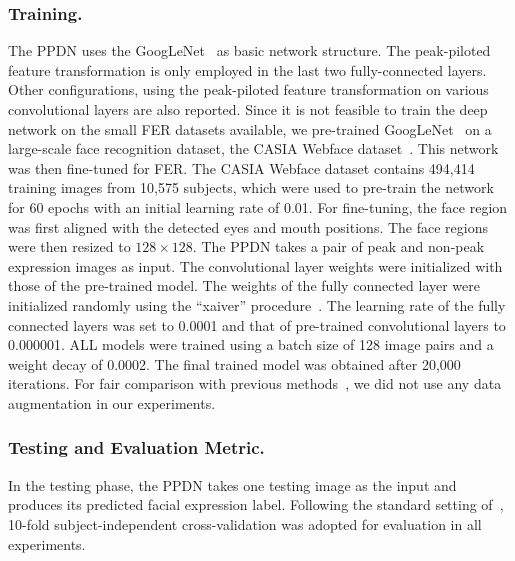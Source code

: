 \documentclass[runningheads]{llncs}
\begin{document}
\subsubsection{Training.} The PPDN uses the GoogLeNet~\cite{szegedy2015going} 
as basic network structure. The peak-piloted feature transformation is only 
employed in the last two fully-connected layers. Other configurations,
using the peak-piloted feature transformation on various convolutional 
layers are also reported. Since it is not feasible to train the deep network 
on the small FER datasets available, we pre-trained 
GoogLeNet~\cite{szegedy2015going} on a large-scale face recognition dataset,  
the CASIA Webface dataset~\cite{yi2014learning}. This network was then 
fine-tuned for FER. The CASIA Webface dataset contains 494,414 training 
images from 10,575 subjects, which were used to pre-train the network 
for 60 epochs with an initial learning rate of 0.01.%
  For fine-tuning, %
the face region 
was first aligned with the detected eyes and mouth positions.%
 The face regions 
were then resized to $128 \times 128$. The PPDN takes a pair of peak and 
non-peak expression images as input. The convolutional layer weights
were initialized with those of the pre-trained model. The weights of the 
fully connected layer were initialized randomly using the 
``xaiver'' procedure~\cite{glorot2010understanding}. The learning rate of 
the fully connected layers was set to 0.0001 and that of pre-trained 
convolutional layers to 0.000001.  ALL models were trained 
using a batch size of 128 image pairs and a weight 
decay of 0.0002. The final trained model was obtained after 20,000 
iterations. For fair comparison with previous 
methods~\cite{zhong2012learning,shan2009facial,liu2014facial}, we did not 
use any data augmentation in our experiments. 


\subsubsection{Testing and Evaluation Metric.}

In the testing phase, the PPDN takes one testing image as the input 
and produces its predicted facial expression label. Following the 
standard setting of~\cite{zhong2012learning,shan2009facial}, 10-fold 
subject-independent cross-validation was adopted for evaluation in all 
experiments. %
\end{document}
